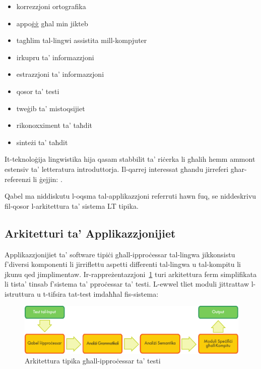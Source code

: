 \begin{multicols}{2}
\begin{itemize}
\item korrezzjoni ortografika
\item appoġġ għal min jikteb
\item tagħlim tal-lingwi assistita mill-kompjuter
\item irkupru ta' informazzjoni
\item estrazzjoni ta' informazzjoni
\item qosor ta' testi
\item tweġib ta' mistoqsijiet
\item rikonoxximent ta' taħdit  
\item sinteżi ta' taħdit 
\end{itemize}

It-teknoloġija lingwistika hija qasam stabbilit ta' riċerka li għalih hemm ammont estensiv ta' letteratura introduttorja. Il-qarrej interessat għandu jirreferi għar-referenzi li ġejjin:  \cite{carstensen-etal1, jurafsky-martin01, manning-schuetze1, lt-world1, lt-survey1}.

Qabel ma niddiskutu l-oqsma tal-applikazzjoni referruti hawn fuq, se niddeskrivu fil-qosor l-arkitettura ta' sistema LT tipika. 

\subsection{Arkitetturi ta’ Applikazzjonijiet}

Applikazzjonijiet ta’ software tipiċi għall-ipproċessar tal-lingwa jikkonsistu f'diversi komponenti li jirriflettu aspetti differenti tal-lingwa u tal-kompitu li jkunu qed jimplimentaw. Ir-rappreżentazzjoni~\ref{fig:textprocessingarch_mt}  turi arkitettura ferm simplifikata li tista’ tinsab f’sistema ta’ pproċessar ta’ testi. L-ewwel tliet moduli jittrattaw l-istruttura u t-tifsira tat-test imdaħħal fis-sistema: 

\begin{figure}[b]
  \center
  \includegraphics[width=\textwidth]{../_media/maltese/text_processing_app_architecture}
  \caption{Arkitettura tipika għall-ipproċessar ta' testi}
  \label{fig:textprocessingarch_mt}
\end{figure}


\end{multicols}
